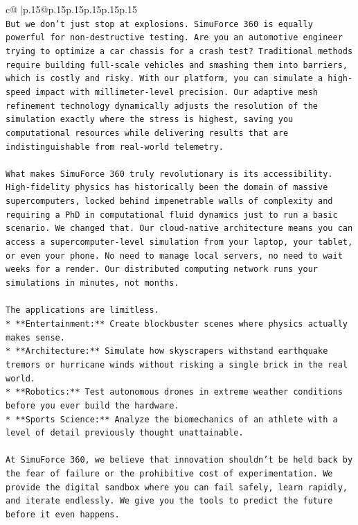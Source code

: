 \documentclass{article}
\begin{document}
{\begin{supertabular}{c@{$\;$}|p{.15\linewidth}@{}p{.15\linewidth}p{.15\linewidth}p{.15\linewidth}p{.15\linewidth}p{.15\linewidth}}
{{{\\ 
\texttt{But we don't just stop at explosions. SimuForce 360 is equally powerful for non{-}destructive testing. Are you an automotive engineer trying to optimize a car chassis for a crash test? Traditional methods require building full{-}scale vehicles and smashing them into barriers, which is costly and risky. With our platform, you can simulate a high{-}speed impact with millimeter{-}level precision. Our adaptive mesh refinement technology dynamically adjusts the resolution of the simulation exactly where the stress is highest, saving you computational resources while delivering results that are indistinguishable from real{-}world telemetry.} \\
\\ 
\texttt{What makes SimuForce 360 truly revolutionary is its accessibility. High{-}fidelity physics has historically been the domain of massive supercomputers, locked behind impenetrable walls of complexity and requiring a PhD in computational fluid dynamics just to run a basic scenario. We changed that. Our cloud{-}native architecture means you can access a supercomputer{-}level simulation from your laptop, your tablet, or even your phone. No need to manage local servers, no need to wait weeks for a render. Our distributed computing network runs your simulations in minutes, not months.} \\
\\ 
\texttt{The applications are limitless.} \\
\texttt{*   **Entertainment:** Create blockbuster scenes where physics actually makes sense.} \\
\texttt{*   **Architecture:** Simulate how skyscrapers withstand earthquake tremors or hurricane winds without risking a single brick in the real world.} \\
\texttt{*   **Robotics:** Test autonomous drones in extreme weather conditions before you ever build the hardware.} \\
\texttt{*   **Sports Science:** Analyze the biomechanics of an athlete with a level of detail previously thought unattainable.} \\
\\ 
\texttt{At SimuForce 360, we believe that innovation shouldn't be held back by the fear of failure or the prohibitive cost of experimentation. We provide the digital sandbox where you can fail safely, learn rapidly, and iterate endlessly. We give you the tools to predict the future before it even happens.} \\
}}}
\end{supertabular}}
\end{document}
